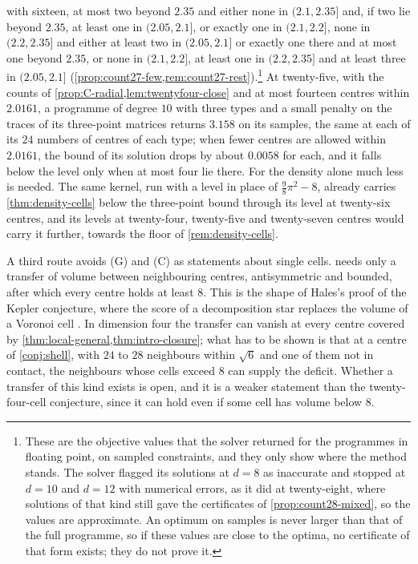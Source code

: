 \documentclass[11pt,reqno]{amsart}
\renewcommand{\_}{\origunderscore\allowbreak}
\numberwithin{equation}{section}
\theoremstyle{plain}
\theoremstyle{definition}
\theoremstyle{remark}
\begin{document}
with sixteen, at most two beyond $2.35$ and either none in $(2.1,2.35]$ and, if two lie beyond $2.35$, at least one in $(2.05,2.1]$, or exactly one in $(2.1,2.2]$, none in $(2.2,2.35]$ and either at least two in $(2.05,2.1]$ or exactly one there and at most one beyond $2.35$, or none in $(2.1,2.2]$, at least one in $(2.2,2.35]$ and at least three in $(2.05,2.1]$
(\cref{prop:count27-few,rem:count27-rest}).\footnote{These are the objective values that the solver returned for
  the programmes in floating point, on sampled constraints, and they only
  show where the method stands. The solver flagged its solutions at $d=8$ as
  inaccurate and stopped at $d=10$ and $d=12$ with numerical errors, as it
  did at twenty-eight, where solutions of that kind still gave the
  certificates of \cref{prop:count28-mixed}, so the values are approximate.
  An optimum on samples is never larger than that of the full programme, so
  if these values are close to the optima, no certificate of that form
  exists; they do not prove it.} At twenty-five, with the counts of
\cref{prop:C-radial,lem:twentyfour-close} and at most fourteen centres
within $2.0161$, a programme of degree $10$ with three types and a small
penalty on the traces of its three-point matrices returns $3.158$ on its
samples, the same at each of its $24$ numbers of centres of each type;
when fewer centres are allowed within $2.0161$, the bound of its solution
drops by about $0.0058$ for each, and it falls below the level only when
at most four lie there. For
the density alone much less is needed. The same kernel, run with a level in
place of $\frac98\pi^2-8$, already carries \cref{thm:density-cells} below the
three-point bound through its level at twenty-six centres, and its levels at
twenty-four, twenty-five and twenty-seven centres would carry it further,
towards the floor of \cref{rem:density-cells}.

A third route avoids (G) and (C) as statements about single cells.
 needs only a transfer of volume between
neighbouring centres, antisymmetric and bounded, after which every centre
holds at least $8$. This is the shape of Hales's proof of the Kepler
conjecture, where the score of a decomposition star replaces the volume of
a Voronoi cell \cite{Hal05}. In dimension four the transfer can vanish at
every centre covered by \cref{thm:local-general,thm:intro-closure}; what
has to be shown is that at a centre of \cref{conj:shell}, with $24$ to
$28$ neighbours within $\sqrt6$ and one of them not in contact, the
neighbours whose cells exceed $8$ can supply the deficit. Whether a
transfer of this kind exists is open, and it is a weaker statement than
the twenty-four-cell conjecture, since it can hold even if some cell has
volume below $8$.
\end{document}
